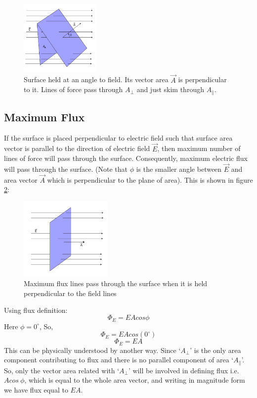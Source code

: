 \begin{figure}[H]
  \centering
  \captionsetup{justification = centering}
  \includegraphics[width = 0.35\textwidth]{Images/Chapter-11/11.10.png}
  \caption{Surface held at an angle to field. Its vector area $\vec{A}$
  is perpendicular to it. Lines of force pass through $A_{\bot}$ and just skim
  through $A_{\parallel}$.}
  \label{fig:11.10}
\end{figure}

\subsection*{Maximum Flux}
If the surface is placed perpendicular to electric field such
that surface area vector is parallel to the direction of electric field $\vec{E}$,
then maximum number of lines of force will pass through the surface.
Consequently, maximum electric flux will pass through the surface.
(Note that $\phi$ is the smaller angle between $\vec{E}$ and area vector
$\vec{A}$ which is perpendicular to the plane of area).
This is shown in figure \ref{fig:11.11}:

\begin{figure}[H]
  \centering
  \captionsetup{justification = centering}
  \includegraphics[width=0.4\textwidth]{Images/Chapter-11/11.11.png}
  \caption{Maximum flux lines pass through the surface when it is held
  perpendicular to the field lines}
  \label{fig:11.11}
\end{figure}
\noindent Using flux definition:
\begin{equation}
  \Phi_{E} = EAcos\phi \nonumber
\end{equation}
Here $\phi = 0^{\circ}$, So,
\begin{equation}
  \Phi_{E} = EAcos(0^{\circ}) \nonumber
\end{equation}
\begin{equation}
  \Phi_{E} = EA \nonumber
\end{equation}
This can be physically understood by another way.
Since `$A_{\bot}$' is the only area component contributing to flux and there
is no parallel component of area `$A_{\parallel}$'. So, only the vector area related with
`$A_{\bot}$' will be involved in defining flux i.e. $Acos\:\phi$,
which is equal to the whole area vector, and writing in magnitude form
we have flux equal to $EA$.

